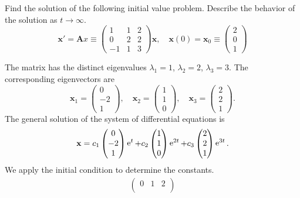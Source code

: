\begin{Example}
  Find the solution of the following initial value problem.
  Describe the behavior of the solution as $t \to \infty$.
  \[
  \mathbf{x}' = \mathbf{A} x \equiv
  \begin{pmatrix}
    1 & 1 & 2 \\
    0 & 2 & 2 \\
    -1 & 1 & 3
  \end{pmatrix} 
  \mathbf{x}, \quad 
  \mathbf{x}(0) = \mathbf{x}_0 \equiv
  \begin{pmatrix}
    2 \\
    0 \\
    1
  \end{pmatrix}
  \]

  The matrix has the distinct eigenvalues $\lambda_1 = 1$, $\lambda_2 = 2$, $\lambda_3 = 3$.  The 
  corresponding eigenvectors are 
  \[
  \mathbf{x}_1 = \begin{pmatrix} 0 \\ -2 \\ 1 \end{pmatrix}, \quad
  \mathbf{x}_2 = \begin{pmatrix} 1 \\ 1 \\ 0 \end{pmatrix}, \quad
  \mathbf{x}_3 = \begin{pmatrix} 2 \\ 2 \\ 1 \end{pmatrix}.
  \]
  The general solution of the system of differential equations is
  \[
  \mathbf{x} = 
  c_1 \begin{pmatrix} 0 \\ -2 \\ 1 \end{pmatrix} \mathop{\mathrm{e}}\nolimits^t
  + c_2 \begin{pmatrix} 1 \\ 1 \\ 0 \end{pmatrix} \mathop{\mathrm{e}}\nolimits^{2 t}
  + c_3 \begin{pmatrix} 2 \\ 2 \\ 1 \end{pmatrix} \mathop{\mathrm{e}}\nolimits^{3 t}.
  \]
  We apply the initial condition to determine the constants.
  \begin{gather*}
    \begin{pmatrix}
      0 & 1 & 2 \\

\end{pmatrix}
\end{gather*}
\end{Example}
